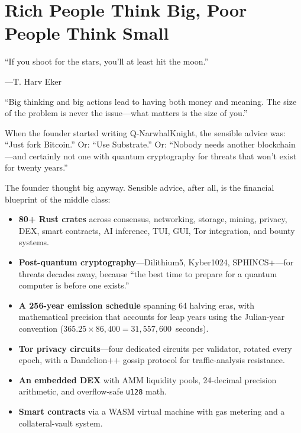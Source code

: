 \documentclass[11pt,a4paper]{article}
\begin{document}
\section{Rich People Think Big, Poor People Think Small}

\epigraph{``If you shoot for the stars, you'll at least hit the moon.''}%
{---T. Harv Eker}

\begin{wealthbox}[title={\raisebox{-0.5pt}{\tiny$\bigstar$} Wealth File \#2}]
``Big thinking and big actions lead to having both money and meaning.
The size of the problem is never the issue---what matters is the size
of you.''
\end{wealthbox}

\vspace{0.3cm}

When the founder started writing Q-NarwhalKnight, the sensible advice was:
``Just fork Bitcoin.'' Or: ``Use Substrate.'' Or: ``Nobody needs another
blockchain---and certainly not one with quantum cryptography for threats
that won't exist for twenty years.''

The founder thought big anyway. Sensible advice, after all, is the
financial blueprint of the middle class:

\begin{itemize}[leftmargin=2em]
    \item \textbf{80+ Rust crates} across consensus, networking, storage,
          mining, privacy, DEX, smart contracts, AI inference, TUI, GUI,
          Tor integration, and bounty systems.
    \item \textbf{Post-quantum cryptography}---Dilithium5, Kyber1024,
          SPHINCS+---for threats decades away, because ``the best time to
          prepare for a quantum computer is before one exists.''
    \item \textbf{A 256-year emission schedule} spanning 64 halving eras,
          with mathematical precision that accounts for leap years using
          the Julian-year convention ($365.25 \times 86{,}400 =
          31{,}557{,}600$~seconds).
    \item \textbf{Tor privacy circuits}---four dedicated circuits per
          validator, rotated every epoch, with a Dandelion++ gossip
          protocol for traffic-analysis resistance.
    \item \textbf{An embedded DEX} with AMM liquidity pools, 24-decimal
          precision arithmetic, and overflow-safe \texttt{u128} math.
    \item \textbf{Smart contracts} via a WASM virtual machine with
          gas metering and a collateral-vault system.
\end{itemize}
\end{document}
